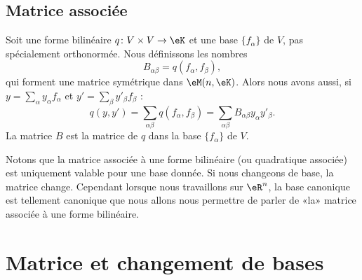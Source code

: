 \subsection{Matrice associée}

Soit une forme bilinéaire \( q\colon V\times V\to \eK\) et une base \( \{ f_{\alpha} \}\) de \( V\), pas spécialement orthonormée. Nous définissons les nombres 
\begin{equation}    \label{EQooCUGFooRlKUtu}
    B_{\alpha\beta}=q(f_{\alpha},f_{\beta}),
\end{equation}
qui forment une matrice symétrique dans \( \eM(n,\eK)\). Alors nous avons aussi, si \( y=\sum_{\alpha}y_{\alpha}f_{\alpha}\) et \( y'=\sum_{\beta}y'_{\beta}f_{\beta}\) :
\begin{equation}
    q(y,y')=\sum_{\alpha\beta}q(f_{\alpha},f_{\beta})=\sum_{\alpha\beta}B_{\alpha\beta}y_{\alpha}y'_{\beta}.
\end{equation}
La matrice \( B\) est la matrice de \( q\) dans la base \( \{ f_{\alpha} \}\) de \( V\).

Notons que la matrice associée à une forme bilinéaire (ou quadratique associée) est uniquement valable pour une base donnée. Si nous changeons de base, la matrice change. Cependant lorsque nous travaillons sur \( \eR^n\), la base canonique est tellement canonique que nous allons nous permettre de parler de «la» matrice associée à une forme bilinéaire. 

\section{Matrice et changement de bases}

